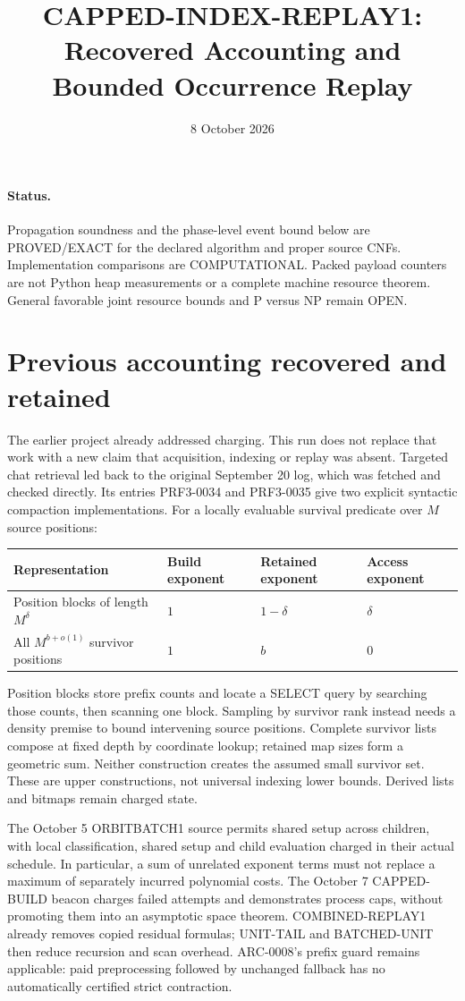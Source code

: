 \documentclass[11pt]{article}
\title{CAPPED-INDEX-REPLAY1: Recovered Accounting and Bounded Occurrence Replay}
\date{8 October 2026}
\begin{document}
\sloppy\maketitle
\paragraph{Status.} Propagation soundness and the phase-level event bound
below are PROVED/EXACT for the declared algorithm and proper source CNFs.
Implementation comparisons are COMPUTATIONAL. Packed payload counters
are not Python heap measurements or a complete machine resource theorem.
General favorable joint resource bounds and P versus NP remain OPEN.

\section{Previous accounting recovered and retained}
The earlier project already addressed charging. This run does not replace
that work with a new claim that acquisition, indexing or replay was absent.
Targeted chat retrieval led back to the original September 20 log,
which was fetched and checked directly. Its entries PRF3-0034 and
PRF3-0035 give two explicit syntactic compaction implementations.
For a locally evaluable survival predicate over $M$ source positions:
\begin{center}
\begin{tabular}{llll}
\toprule
Representation & Build exponent & Retained exponent & Access exponent\\
\midrule
Position blocks of length $M^\delta$ & $1$ & $1-\delta$ & $\delta$\\
All $M^{b+o(1)}$ survivor positions & $1$ & $b$ & $0$\\
\bottomrule
\end{tabular}
\end{center}
Position blocks store prefix counts and locate a SELECT query by searching
those counts, then scanning one block. Sampling by survivor rank instead
needs a density premise to bound intervening source positions. Complete
survivor lists compose at fixed depth by coordinate lookup; retained map
sizes form a geometric sum. Neither construction creates the assumed
small survivor set. These are upper constructions, not universal indexing
lower bounds. Derived lists and bitmaps remain charged state.

The October 5 ORBITBATCH1 source permits shared setup across children,
with local classification, shared setup and child evaluation charged in
their actual schedule. In particular, a sum of unrelated exponent terms
must not replace a maximum of separately incurred polynomial costs.
The October 7 CAPPED-BUILD beacon charges failed attempts and demonstrates
process caps, without promoting them into an asymptotic space theorem.
COMBINED-REPLAY1 already removes copied residual formulas; UNIT-TAIL and
BATCHED-UNIT then reduce recursion and scan overhead. ARC-0008's prefix
guard remains applicable: paid preprocessing followed by unchanged
fallback has no automatically certified strict contraction.
\end{document}
